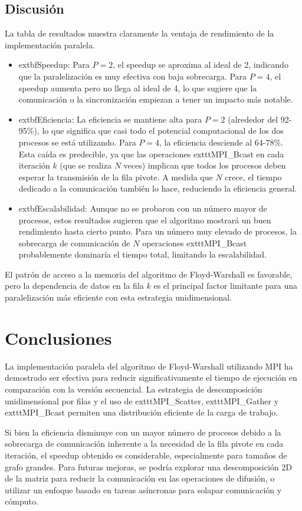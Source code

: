 \documentclass[12pt, a4paper]{article}
\begin{document}
\subsection{Discusión}
La tabla de resultados muestra claramente la ventaja de rendimiento de la implementación paralela.

\begin{itemize}
    \item 	extbf{Speedup:} Para $P=2$, el speedup se aproxima al ideal de 2, indicando que la paralelización es muy efectiva con baja sobrecarga. Para $P=4$, el speedup aumenta pero no llega al ideal de 4, lo que sugiere que la comunicación o la sincronización empiezan a tener un impacto más notable.
    \item 	extbf{Eficiencia:} La eficiencia se mantiene alta para $P=2$ (alrededor del 92-95\%), lo que significa que casi todo el potencial computacional de los dos procesos se está utilizando. Para $P=4$, la eficiencia desciende al 64-78\%. Esta caída es predecible, ya que las operaciones 	exttt{MPI\_Bcast} en cada iteración $k$ (que se realiza $N$ veces) implican que todos los procesos deben esperar la transmisión de la fila pivote. A medida que $N$ crece, el tiempo dedicado a la comunicación también lo hace, reduciendo la eficiencia general.
    \item 	extbf{Escalabilidad:} Aunque no se probaron con un número mayor de procesos, estos resultados sugieren que el algoritmo mostrará un buen rendimiento hasta cierto punto. Para un número muy elevado de procesos, la sobrecarga de comunicación de $N$ operaciones 	exttt{MPI\_Bcast} probablemente dominaría el tiempo total, limitando la escalabilidad.
\end{itemize}

El patrón de acceso a la memoria del algoritmo de Floyd-Warshall es favorable, pero la dependencia de datos en la fila $k$ es el principal factor limitante para una paralelización más eficiente con esta estrategia unidimensional.

\section{Conclusiones}
La implementación paralela del algoritmo de Floyd-Warshall utilizando MPI ha demostrado ser efectiva para reducir significativamente el tiempo de ejecución en comparación con la versión secuencial. La estrategia de descomposición unidimensional por filas y el uso de 	exttt{MPI\_Scatter}, 	exttt{MPI\_Gather} y 	exttt{MPI\_Bcast} permiten una distribución eficiente de la carga de trabajo.

Si bien la eficiencia disminuye con un mayor número de procesos debido a la sobrecarga de comunicación inherente a la necesidad de la fila pivote en cada iteración, el speedup obtenido es considerable, especialmente para tamaños de grafo grandes. Para futuras mejoras, se podría explorar una descomposición 2D de la matriz para reducir la comunicación en las operaciones de difusión, o utilizar un enfoque basado en tareas asíncronas para solapar comunicación y cómputo.
\end{document}
